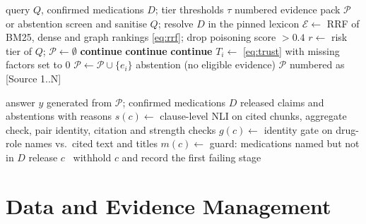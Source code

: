 \documentclass[conference]{IEEEtran}
\begin{document}
\begin{algorithm}[!t]
\caption{Evidence admission (pre-generation)}
\label{alg:admit}
\begin{algorithmic}[1]
\Require query $Q$, confirmed medications $D$; tier thresholds $\tau$
\Ensure numbered evidence pack $\mathcal{P}$ or abstention
\State screen and sanitise $Q$; resolve $D$ in the pinned lexicon
\State $\mathcal{E} \gets$ RRF of BM25, dense and graph rankings \eqref{eq:rrf}; drop poisoning score $> 0.4$
\State $r \gets$ risk tier of $Q$; $\mathcal{P} \gets \emptyset$
   \textbf{continue} \EndIf
   \textbf{continue} \EndIf
   \textbf{continue} \EndIf
  \State $T_i \gets$ \eqref{eq:trust} with missing factors set to 0
   $\mathcal{P} \gets \mathcal{P} \cup \{e_i\}$ \EndIf
\EndFor
{} \Return abstention (no eligible evidence) \EndIf
\State \Return $\mathcal{P}$ numbered as [Source 1..N]
\end{algorithmic}
\end{algorithm}

\begin{algorithm}[!t]
\caption{Claim verification and release (post-generation)}
\label{alg:verify}
\begin{algorithmic}[1]
\Require answer $y$ generated from $\mathcal{P}$; confirmed medications $D$
\Ensure released claims and abstentions with reasons
  \State $s(c) \gets$ clause-level NLI on cited chunks, aggregate check, pair identity, citation and strength checks
  \State $g(c) \gets$ identity gate on drug-role names vs.\ cited text and titles
  \State $m(c) \gets$ guard: medications named but not in $D$
   release $c$ \Else\ withhold $c$ and record the first failing stage \EndIf
\EndFor
\end{algorithmic}
\end{algorithm}

\section{Data and Evidence Management}
\label{sec:data}
\end{document}
